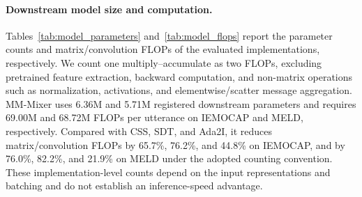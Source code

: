 \documentclass[letterpaper]{article} %
\begin{document}
\paragraph{Downstream model size and computation.}
Tables~\ref{tab:model_parameters} and~\ref{tab:model_flops} report
the parameter counts and matrix/convolution FLOPs of the evaluated
implementations, respectively. We count
one multiply--accumulate as two FLOPs, excluding pretrained feature
extraction, backward computation, and non-matrix operations such as
normalization, activations, and elementwise/scatter message aggregation.
MM-Mixer uses 6.36M and 5.71M registered downstream parameters and
requires 69.00M and 68.72M FLOPs per utterance on IEMOCAP and MELD,
respectively. Compared with CSS, SDT, and Ada2I, it reduces
matrix/convolution FLOPs by 65.7\%, 76.2\%, and 44.8\%
on IEMOCAP, and by 76.0\%, 82.2\%, and 21.9\% on MELD
under the adopted counting convention.
These implementation-level counts depend on the input representations
and batching and do not establish an inference-speed advantage.


\begin{table}[t]
\centering
\caption{Component ablation results on IEMOCAP and MELD. AG denotes Adaptive Gating. MCA denotes Modality-centric Cross-modal Alignment. AMM denotes Axis-wise Multimodal Mixer. EPIRC denotes Explicit Pairwise Interaction Residual Correction.}
\label{tab:component_ablation}
\end{table}
\end{document}
